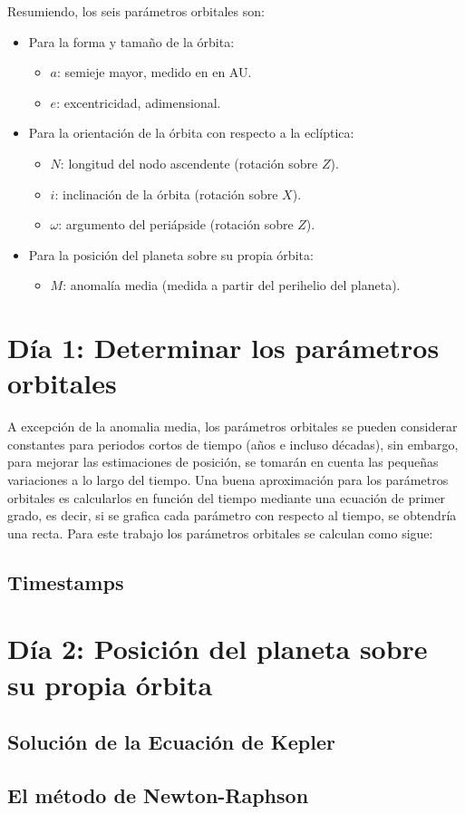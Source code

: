 \documentclass[a4paper,10pt]{article}
\begin{document}
Resumiendo, los seis parámetros orbitales son:
\begin{itemize}
  \item Para la forma y tamaño de la órbita:
  \begin{itemize}
  \item \textbf{$a$}: semieje mayor, medido en en AU.
  \item \textbf{$e$}: excentricidad, adimensional.
  \end{itemize}
  \item Para la orientación de la órbita con respecto a la eclíptica:
  \begin{itemize}
  \item \textbf{$N$}: longitud del nodo ascendente (rotación sobre $Z$).
  \item \textbf{$i$}: inclinación de la órbita (rotación sobre $X$).
  \item \textbf{$\omega$}: argumento del periápside (rotación sobre $Z$). 
  \end{itemize}
  \item Para la posición del planeta sobre su propia órbita:
  \begin{itemize}
  \item \textbf{$M$}: anomalía media (medida a partir del perihelio del planeta).
  \end{itemize}
\end{itemize}


\section{Día 1: Determinar los parámetros orbitales}
A excepción de la anomalia media, los parámetros orbitales se pueden considerar constantes para periodos cortos de tiempo (años e incluso décadas), sin embargo, para mejorar las estimaciones de posición, se tomarán en cuenta las pequeñas variaciones a lo largo del tiempo. Una buena aproximación para los parámetros orbitales es calcularlos en función del tiempo mediante una ecuación de primer grado, es decir, si se grafica cada parámetro con respecto al tiempo, se obtendría una recta. Para este trabajo los parámetros orbitales se calculan como sigue:

\subsection{Timestamps}

\section{Día 2: Posición del planeta sobre su propia órbita}

\subsection{Solución de la Ecuación de Kepler}

\subsection{El método de Newton-Raphson}
\end{document}
